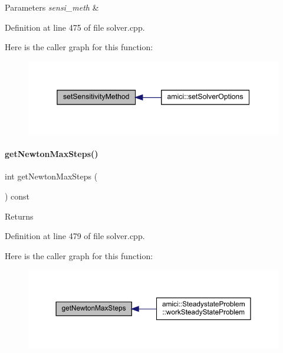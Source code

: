 \begin{DoxyParams}{Parameters}
{\em sensi\+\_\+meth} & \\
\hline
\end{DoxyParams}


Definition at line 475 of file solver.\+cpp.

Here is the caller graph for this function\+:
\nopagebreak
\begin{figure}[H]
\begin{center}
\leavevmode
\includegraphics[width=345pt]{classamici_1_1_solver_a3a7713f2ce77ffade77445a825ad289d_icgraph}
\end{center}
\end{figure}
\mbox{\label{classamici_1_1_solver_ad68589cfe3af35633ff5fa1a4e7aaddb}} 
\paragraph{\texorpdfstring{get\+Newton\+Max\+Steps()}{getNewtonMaxSteps()}}
{\footnotesize\ttfamily int get\+Newton\+Max\+Steps (\begin{DoxyParamCaption}{ }\end{DoxyParamCaption}) const}

\begin{DoxyReturn}{Returns}

\end{DoxyReturn}


Definition at line 479 of file solver.\+cpp.

Here is the caller graph for this function\+:
\nopagebreak
\begin{figure}[H]
\begin{center}
\leavevmode
\includegraphics[width=350pt]{classamici_1_1_solver_ad68589cfe3af35633ff5fa1a4e7aaddb_icgraph}
\end{center}
\end{figure}
\mbox{\label{classamici_1_1_solver_abf2e868e186c724c8ab939ba261ef314}} 
